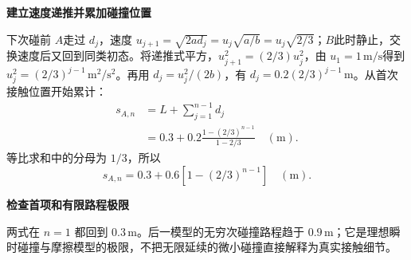 \begin{solution}
\par\medskip{}\noindent\textbf{建立速度递推并累加碰撞位置}\par\nobreak
下次碰前 $A$走过 $d_j$，速度 $u_{j+1}=\sqrt{2ad_j}=u_j\sqrt{a/b}=u_j\sqrt{2/3}$；$B$此时静止，交换速度后又回到同类初态。将递推式平方，$u_{j+1}^2=(2/3)u_j^2$，由 $u_1=1\,\mathrm{m/s}$得到 $u_j^2=(2/3)^{j-1}\,\mathrm{m^2/s^2}$。再用 $d_j=u_j^2/(2b)$，有 $d_j=0.2(2/3)^{j-1}\,\mathrm m$。从首次接触位置开始累计：
\begin{align*}
 s_{A,n}&=L+\sum_{j=1}^{n-1}d_j\\
 &=0.3+0.2\frac{1-(2/3)^{n-1}}{1-2/3}
 \quad(\mathrm m).
\end{align*}
等比求和中的分母为 $1/3$，所以
\[s_{A,n}=0.3+0.6\left[1-(2/3)^{n-1}\right]\quad(\mathrm m).\]


\par\medskip{}\noindent\textbf{检查首项和有限路程极限}\par\nobreak
两式在 $n=1$ 都回到 $0.3\,\mathrm m$。后一模型的无穷次碰撞路程趋于 $0.9\,\mathrm m$；它是理想瞬时碰撞与摩擦模型的极限，不把无限延续的微小碰撞直接解释为真实接触细节。
\end{solution}

